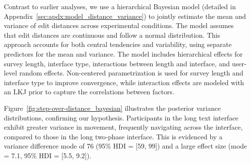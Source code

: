Contrast to earlier analyses, we use a hierarchical Bayesian model (detailed in Appendix~\ref{sec:apdx:model_distance_variance}) to jointly estimate the mean and variance of edit distances across experimental conditions. The model assumes that edit distances are continuous and follow a normal distribution. This approach accounts for both central tendencies and variability, using separate predictors for the mean and variance. The model includes hierarchical effects for survey length, interface type, interactions between length and interface, and user-level random effects. Non-centered parametrization is used for survey length and interface type to improve convergence, while interaction effects are modeled with an LKJ prior to capture the correlations between factors. %

Figure~\ref{fig:step-over-distance_bayesian} illustrates the posterior variance distributions, confirming our hypothesis. Participants in the long text interface exhibit greater variance in movement, frequently navigating across the interface, compared to those in the long two-phase interface. This is evidenced by a variance difference mode of 76 (95\% HDI = [59, 99]) and a large effect size (mode = 7.1, 95\% HDI = [5.5, 9.2]).

